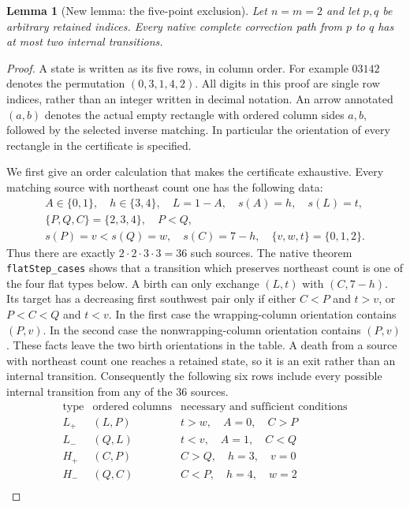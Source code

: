 \documentclass[11pt,oneside]{report}
\newtheorem{lemma}[theorem]{Lemma}
\theoremstyle{definition}
\numberwithin{equation}{section}
\newcommand{\decl}[1]{\textnormal{\nolinkurl{#1}}}
\begin{document}
\begin{lemma}[New lemma: the five-point exclusion]
\label{J06:lem:seam-size-five-truncation}
Let $n=m=2$ and let $p,q$ be arbitrary retained indices.
Every native complete correction path from $p$ to $q$ has at most two
internal transitions.
\end{lemma}
\begin{proof}
A state is written as its five rows, in column order. For example
$03142$ denotes the permutation $(0,3,1,4,2)$.
All digits in this proof are single row indices, rather than an integer
written in decimal notation. An arrow annotated $(a,b)$ denotes the
actual empty rectangle with ordered column sides $a,b$, followed by
the selected inverse matching. In particular the orientation of every
rectangle in the certificate is specified.

We first give an order calculation that makes the certificate exhaustive.
Every matching source with northeast count one has the following data:
\[
\begin{gathered}
 A\in\{0,1\},\quad h\in\{3,4\},\quad L=1-A,\quad s(A)=h,\quad s(L)=t,\\
 \{P,Q,C\}=\{2,3,4\},\quad P<Q,\\
 s(P)=v<s(Q)=w,\quad s(C)=7-h,\quad
 \{v,w,t\}=\{0,1,2\}.
\end{gathered}
\]
Thus there are exactly $2\cdot2\cdot3\cdot3=36$ such sources.
The native theorem \decl{flatStep_cases} shows that a transition which
preserves northeast count is one of the four flat types below.
A birth can only exchange $(L,t)$ with $(C,7-h)$.
Its target has a decreasing first southwest pair only if either
$C<P$ and $t>v$, or $P<C<Q$ and $t<v$.
In the first case the wrapping-column orientation contains $(P,v)$.
In the second case the nonwrapping-column orientation contains $(P,v)$.
These facts leave the two birth orientations in the table.
A death from a source with northeast count one reaches a retained state,
so it is an exit rather than an internal transition.
Consequently the following six rows include every possible internal
transition from any of the 36 sources.
\[
\begin{array}{c|c|l}
 \text{type}&\text{ordered columns}&\text{necessary and sufficient conditions}\\\hline
 L_+&(L,P)&t>w,\quad A=0,\quad C>P\\
 L_-&(Q,L)&t<v,\quad A=1,\quad C<Q\\
 H_+&(C,P)&C>Q,\quad h=3,\quad v=0\\
 H_-&(Q,C)&C<P,\quad h=4,\quad w=2\\

\end{array}\]
\end{proof}
\end{document}
